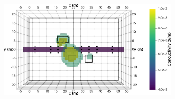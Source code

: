 \documentclass[preprint,authoryear,12pt]{elsarticle}
\begin{document}
\begin{figure}[htp]{}
\begin{center}
\begin{subfigure}{0.55\linewidth}
      \end{subfigure}
      \hspace{-4.0cm}
      \qquad
      \begin{subfigure}{0.55\linewidth}
         \label{fig:MultiBlk_StraightTunnel_RxSelection_10mBlk_DataDiff10Perc_40RxPerTx_Top_2ISO}
         \includegraphics[trim=0cm 0cm 0cm 0cm, clip=true,width=\linewidth]{./figures/Fig24f.png}
      \end{subfigure}
      \vspace{0.2cm}


\end{center}
\end{figure}
\end{document}
